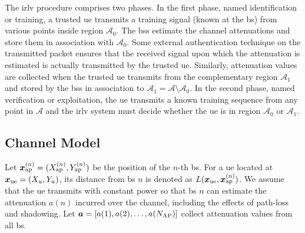 \documentclass[conference,final]{IEEEtran}
\begin{document}
The \ac{irlv} procedure comprises two phases. In the first phase, named identification or training, a trusted \ac{ue} transmits a training signal (known at the \acs{bs}) from various points inside region $\mathcal{A}_0$.  The \acp{bs} estimate the channel attenuations and store them in association with $\mathcal{A}_0$. Some external authentication technique on the transmitted packet  ensures that the received signal upon which the attenuation is estimated is actually transmitted by the trusted \ac{ue}. Similarly, attenuation values are collected when the trusted \ac{ue} transmits  from the complementary region $\mathcal{A}_1$ and  stored by the \acp{bs} in association to $\mathcal{A}_1 = \mathcal{A} \setminus \mathcal{A}_0$. In the second  phase, named verification or exploitation, the \ac{ue} transmits a known training sequence from any point in $\mathcal{A}$ and the \ac{irlv} system must decide whether the \ac{ue} is in region $\mathcal{A}_0$ or $\mathcal{A}_1$.


\subsection{Channel Model}

Let $\bm{x}_{\rm ap}^{(n)} =(X_{\rm ap}^{(n)},Y_{\rm ap}^{(n)})$ be the position of the $n$-th \ac{bs}. For a \ac{ue} located at $\bm{x}_{\rm ue}=(X_u,Y_u)$, its distance from \ac{bs} $n$ is denoted as $L(\bm{x}_{\rm ue},\bm{x}_{\rm ap}^{(n)})$. We assume that  the \ac{ue} transmits with constant power so that  \ac{bs} $n$ can estimate the attenuation $a{(n)}$ incurred over the channel, including the effects of path-loss and shadowing. Let $\bm a = [a(1), a(2), \ldots, a(N_{\rm AP})]$ collect attenuation values from all \ac{bs}.
\end{document}
